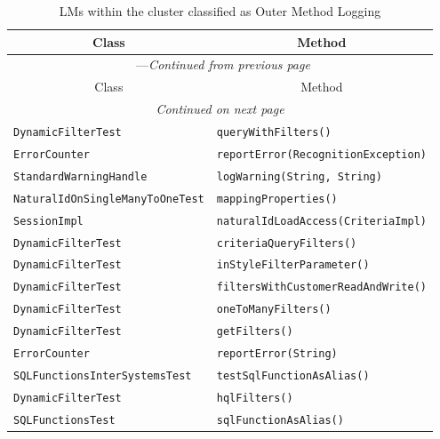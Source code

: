 \begin{center}
\begin{longtable}{ll}
\caption{LMs within the cluster classified as Outer Method Logging}\\
\toprule\multicolumn{1}{c}{Class}&\multicolumn{1}{c}{Method}\\\midrule
\endfirsthead

\multicolumn{2}{c}{\tablename\ \thetable{}---\textit{Continued from previous page}} \\\midrule
\multicolumn{1}{c}{Class}&\multicolumn{1}{c}{Method}\\\midrule
\endhead
\multicolumn{2}{c}{\textit{Continued on next page}}\\\midrule
\endfoot
\bottomrule
\endlastfoot

\lstinline/DynamicFilterTest/&{\lstinline/queryWithFilters()/}\\
\lstinline/ErrorCounter/&{\lstinline/reportError(RecognitionException)/}\\
\lstinline/StandardWarningHandle/&{\lstinline/logWarning(String, String)/}\\
\lstinline/NaturalIdOnSingleManyToOneTest/&{\lstinline/mappingProperties()/}\\
\lstinline/SessionImpl/&{\lstinline/naturalIdLoadAccess(CriteriaImpl)/}\\
\lstinline/DynamicFilterTest/&{\lstinline/criteriaQueryFilters()/}\\
\lstinline/DynamicFilterTest/&{\lstinline/inStyleFilterParameter()/}\\
\lstinline/DynamicFilterTest/&{\lstinline/filtersWithCustomerReadAndWrite()/}\\
\lstinline/DynamicFilterTest/&{\lstinline/oneToManyFilters()/}\\
\lstinline/DynamicFilterTest/&{\lstinline/getFilters()/}\\
\lstinline/ErrorCounter/&{\lstinline/reportError(String)/}\\
\lstinline/SQLFunctionsInterSystemsTest/&{\lstinline/testSqlFunctionAsAlias()/}\\
\lstinline/DynamicFilterTest/&{\lstinline/hqlFilters()/}\\
\lstinline/SQLFunctionsTest/&{\lstinline/sqlFunctionAsAlias()/}\\
\end{longtable}
\end{center}

